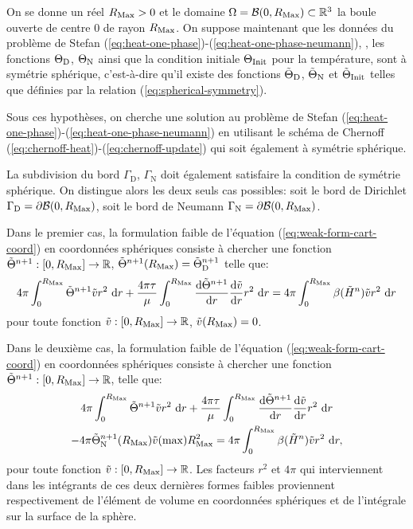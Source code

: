 On se donne un réel $R_\mathrm{Max} > 0$ et le domaine $\Omega = \mathcal B(0,
R_\mathrm{Max}) \subset \mathbb R^3$ la boule ouverte de centre $0$ de rayon
$R_\mathrm{Max}$. On suppose maintenant que les données du problème de Stefan
(\ref{eq:heat-one-phase})-(\ref{eq:heat-one-phase-neumann}), \ie, les
fonctions $\Theta_\mathrm{D}$, $\Theta_\mathrm{N}$ ainsi
que la condition initiale $\Theta_\text{Init}$ pour la température, sont à
symétrie sphérique, c'est-à-dire qu'il existe des fonctions $\tilde
{\Theta}_\mathrm{D}$, $\tilde{\Theta}_\mathrm{N}$ et $\tilde{\Theta}_\text{Init}$
telles que définies par la relation (\ref{eq:spherical-symmetry}).

Sous ces hypothèses, on cherche une solution au problème de Stefan
(\ref{eq:heat-one-phase})-(\ref{eq:heat-one-phase-neumann}) en
utilisant le schéma de Chernoff
(\ref{eq:chernoff-heat})-(\ref{eq:chernoff-update}) qui soit également
à symétrie sphérique.

La subdivision du bord $\Gamma_\mathrm{D}$, $\Gamma_\mathrm{N}$ doit
également satisfaire la condition de symétrie sphérique. On distingue alors les
deux seuls cas possibles:
soit le bord de Dirichlet $\Gamma_\mathrm{D} = \partial\mathcal
B(0,R_\mathrm{Max})$, soit le bord de Neumann $\Gamma_\mathrm{N} =
\partial\mathcal B(0,R_\mathrm{Max})$.

Dans le premier cas, la formulation faible de l'équation
(\ref{eq:weak-form-cart-coord}) en coordonnées sphériques consiste à
chercher une fonction $\tilde {\Theta}^{n+1}:[0,R_\mathrm{Max}] \to \mathbb
R$, $\tilde{\Theta}^{n+1}(R_\mathrm{Max}) =
\tilde{\Theta}_{\mathrm{D}}^{n+1}$ telle que:
\begin{multline}\label{eq:weak-form-spher-coord-dirichlet}
  4\pi\int_0^{\rmax} \tilde \temperature^{n+1}\tilde v r^2\,\intd{r}
  + \frac{4\pi\tau}{\mu}\int_0^{\rmax} \frac{\mathrm d %
    \tilde \temperature^{n+1}}{\mathrm d r} \frac{\mathrm d \tilde v}{\mathrm d %
    r}r^2\,\intd{r}  %
  = 4\pi\int_0^{\rmax} \beta(\tilde \enthalpydensity^n)\tilde v r^2\,\intd{r}
\end{multline}
pour toute fonction $\tilde v:[0,R_\mathrm{Max}]\to\mathbb R$, $\tilde v(R_\mathrm{Max})
= 0$.

Dans le deuxième cas, la formulation faible de l'équation
(\ref{eq:weak-form-cart-coord}) en coordonnées sphériques consiste à
chercher une fonction $\tilde {\Theta}^{n+1}:[0,R_\mathrm{Max}] \to \mathbb
R$, telle que:
\begin{multline}\label{eq:weak-form-spher-coord-neumann}
  4\pi\int_0^{\rmax} \tilde \temperature^{n+1}\tilde v r^2\,\intd{r}
  + \frac{4\pi\tau}{\mu}\int_0^{\rmax} \frac{\mathrm d %
    \tilde \temperature^{n+1}}{\mathrm d r} \frac{\mathrm d \tilde v}{\mathrm d %
    r}r^2\,\intd{r} \\
  - 4\pi\tilde\temperature^{n+1}_\mathrm{N}(\rmax)\tilde v(\max)\rmax^2%
  = 4\pi\int_0^{\rmax} \beta(\tilde \enthalpydensity^n)\tilde v r^2\,\intd{r},
\end{multline}
pour toute fonction $\tilde v:[0,R_\mathrm{Max}]\to\mathbb R$. Les facteurs
$r^2$ et $4\pi$ qui interviennent dans les intégrants de ces deux dernières
formes faibles proviennent respectivement de l'élément de volume en
coordonnées sphériques et de l'intégrale sur la surface de la sphère.

